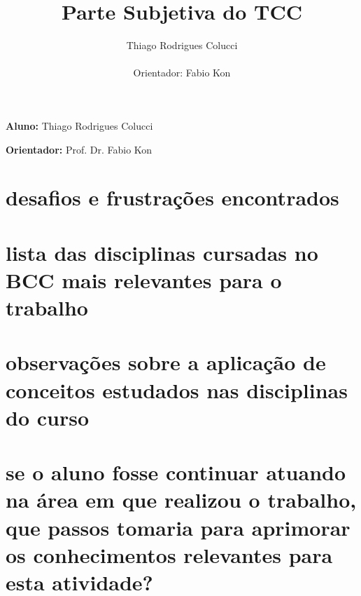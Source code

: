 \documentclass[11pt,a4paper]{article}
\title{Parte Subjetiva do TCC}
\author{Thiago Rodrigues Colucci\\\\Orientador: Fabio Kon}
\begin{document}
\maketitle

\newpage

\tableofcontents
\newpage
\textbf{Aluno:} Thiago Rodrigues Colucci

\textbf{Orientador:} Prof. Dr. Fabio Kon





\section{ desafios e frustrações encontrados}


\section{lista das disciplinas cursadas no BCC mais relevantes para o trabalho}


\section{observações sobre a aplicação de conceitos estudados nas disciplinas do curso}


\section{se o aluno fosse continuar atuando na área em que realizou o trabalho, que passos tomaria para aprimorar os conhecimentos relevantes para esta atividade?}
\end{document}
